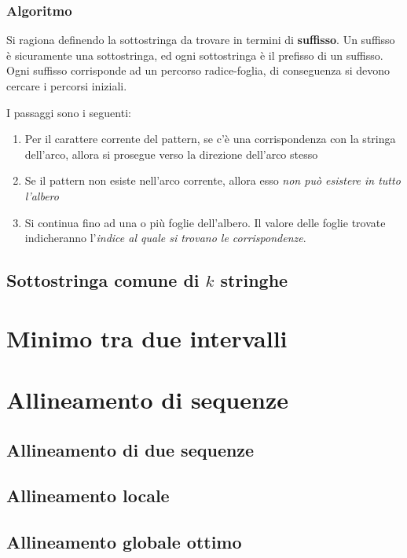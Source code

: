 \documentclass{article}
\begin{document}
\subsubsection{Algoritmo}

Si ragiona definendo la sottostringa da trovare in termini di \textbf{suffisso}. Un suffisso è sicuramente una sottostringa, ed ogni sottostringa è il prefisso di un suffisso. Ogni suffisso corrisponde ad un percorso radice-foglia, di conseguenza si devono cercare i percorsi iniziali.

I passaggi sono i seguenti:
\begin{enumerate}
    \item Per il carattere corrente del pattern, se c'è una corrispondenza con la stringa dell'arco, allora si prosegue verso la direzione dell'arco stesso
    \item Se il pattern non esiste nell'arco corrente, allora esso \textit{non può esistere in tutto l'albero}
    \item Si continua fino ad una o più foglie dell'albero. Il valore delle foglie trovate indicheranno l'\textit{indice al quale si trovano le corrispondenze}.
\end{enumerate}

\subsection{Sottostringa comune di $k$ stringhe}

\section{Minimo tra due intervalli}

\section{Allineamento di sequenze}

\subsection{Allineamento di due sequenze}

\subsection{Allineamento locale}

\subsection{Allineamento globale ottimo}
\end{document}
